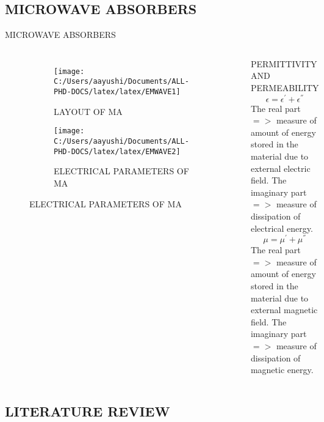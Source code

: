 \documentclass[11pt,aspect ratio=169]{beamer}
\begin{document}
\subsection{MICROWAVE ABSORBERS}
\begin{frame}{MICROWAVE ABSORBERS}
	
	\begin{columns}
	
	\begin{figure}[ht]
			\begin{subfigure}{0.8\textwidth}
			\texttt{[image: C:/Users/aayushi/Documents/ALL-PHD-DOCS/latex/latex/EMWAVE1]}
				\caption{ LAYOUT OF MA}
			\label{fig:emwave1}
			\end{subfigure}
			  \begin{subfigure}{0.8\textwidth}	
			\texttt{[image: C:/Users/aayushi/Documents/ALL-PHD-DOCS/latex/latex/EMWAVE2]}
			\caption{ELECTRICAL PARAMETERS OF MA}
			\label{fig:emwave2}
			\end{subfigure}
	\end{figure}
	\begin{block}{PERMITTIVITY AND PERMEABILITY}
	\begin{equation}
	\epsilon={\epsilon}^{'} +{\epsilon}^{''}
	\end{equation}
	The real part $=>$ measure of amount of energy stored in the material due to external electric field.
	The imaginary part $=>$ measure of dissipation of electrical energy.
		\begin{equation}
	\mu={\mu}^{'} +{\mu}^{''}
	\end{equation}
	The real part $=>$ measure of amount of energy stored in the material due to external magnetic field.
The imaginary part $=>$ measure of dissipation of magnetic energy.	
	\end{block}
\end{columns}
\subsection{LITERATURE REVIEW}
\end{frame}
\end{document}
